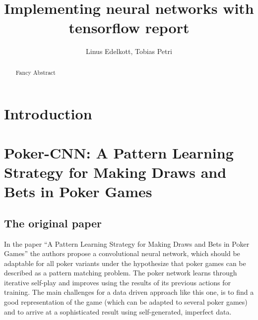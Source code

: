 \documentclass[]{report}
\title{Implementing neural networks with tensorflow report}
\author{Linus Edelkott, Tobias Petri}
\begin{document}
\maketitle

\begin{abstract}
	Fancy Abstract
\end{abstract}


\section{Introduction}
\section{Poker-CNN: A Pattern Learning Strategy for Making Draws and Bets in Poker Games}
\subsection{The original paper}
In the paper ``A Pattern Learning Strategy for Making Draws and Bets
in Poker Games''\cite{1} the authors propose a convolutional
neural network, which should be adaptable for all poker variants under
the hypothesize that poker games can be described as a pattern matching
problem. The poker network learns through iterative self-play and
improves using the results of its previous actions for training. The
main challenges for a data driven approach like this one, is to find
a good representation of the game (which can be adapted to several
poker games) and to arrive at a sophisticated result using self-generated,
imperfect data.
\end{document}

